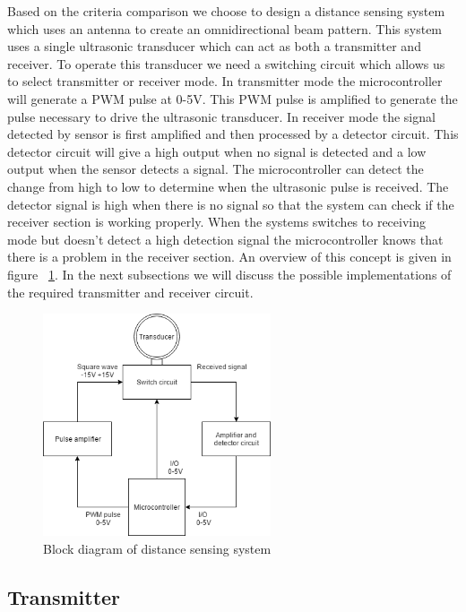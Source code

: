 Based on the criteria comparison we choose to design a distance sensing system which uses an antenna to create an omnidirectional beam pattern. This system uses a single ultrasonic transducer which can act as both a transmitter and receiver. To operate this transducer we need a switching circuit which allows us to select transmitter or receiver mode. In transmitter mode the microcontroller will generate a PWM pulse at 0-5V. This PWM pulse is amplified to generate the pulse necessary to drive the ultrasonic transducer. In receiver mode the signal detected by sensor is first amplified and then processed by a detector circuit. This detector circuit will give a high output when no signal is detected and a low output when the sensor detects a signal. The microcontroller can detect the change from high to low to determine when the ultrasonic pulse is received. The detector signal is high when there is no signal so that the system can check if the receiver section is working properly. When the systems switches to receiving mode but doesn't detect a high detection signal the microcontroller knows that there is a problem in the receiver section. An overview of this concept is given in figure ~\ref{fig:ultra3}. In the next subsections we will discuss the possible implementations of the required transmitter and receiver circuit.

\begin{figure}[H]
\centering
\includegraphics[width=0.6\textwidth]{Figures/concept.png}
\caption{Block diagram of distance sensing system}
\label{fig:ultra3}
\end{figure}

\subsection{Transmitter}
\label{chap:trans}

